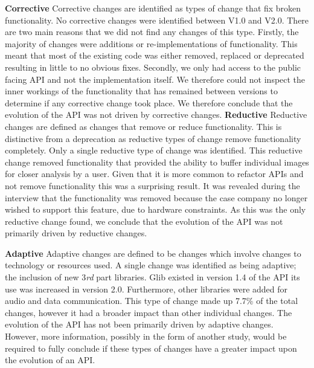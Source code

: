 \documentclass{sig-alternate}
\begin{document}
\smallskip \noindent
\textbf{Corrective  }
Corrective changes are identified as types of change that fix broken functionality.
No corrective changes were identified between V1.0 and V2.0. There are two main reasons that we did not find any changes of this type. Firstly, the majority of changes were additions or re-implementations of functionality. This meant that most of the existing code was either removed, replaced or deprecated resulting in little to no obvious fixes. Secondly, we only had access to the public facing API and not the implementation itself. We therefore could not inspect the inner workings of the functionality that has remained between versions to determine if any corrective change took place.
We therefore conclude that the evolution of the API was not driven by corrective changes.
\smallskip \noindent
\textbf{Reductive  }
Reductive changes are defined as changes that remove or reduce functionality. This is distinctive from a deprecation as reductive types of change remove functionality completely.
Only a single reductive type of change was identified. This reductive change removed functionality that provided the ability to buffer individual images for closer analysis by a user. Given that it is more common to refactor APIs and not remove functionality \cite{dig2005role, xing2006refactoring} this was a surprising result. 
It was revealed during the interview that the functionality was removed because the case company no longer wished to support this feature, due to hardware constraints. 
As this was the only reductive change found, we conclude that the evolution of the API was not primarily driven by reductive changes.

\smallskip \noindent
\textbf{Adaptive  }
Adaptive changes are defined to be changes which involve changes to technology or resources used. 
A single change was identified as being adaptive; the inclusion of new 3\textit{rd} part libraries. Glib existed in version 1.4 of the API its use was increased in version 2.0. Furthermore, other libraries were added for audio and data communication. This type of change made up 7.7\% of the total changes, however it had a broader impact than other individual changes.
The evolution of the API has not been primarily driven by adaptive changes. However, more information, possibly in the form of another study, would be required to fully conclude if these types of changes have a greater impact upon the evolution of an API.
\end{document}
